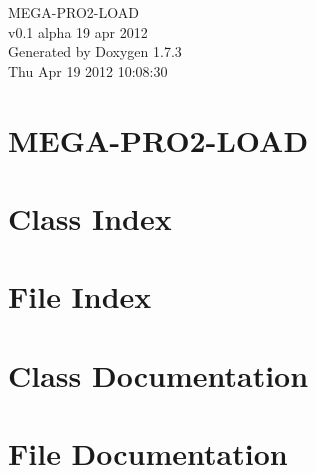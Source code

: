 \documentclass[a4paper]{book}
\begin{document}
\hypersetup{pageanchor=false}
\begin{titlepage}
\vspace*{7cm}
\begin{center}
{\Large MEGA-\/PRO2-\/LOAD \\[1ex]\large v0.1 alpha 19 apr 2012 }\\
\vspace*{1cm}
{\large Generated by Doxygen 1.7.3}\\
\vspace*{0.5cm}
{\small Thu Apr 19 2012 10:08:30}\\
\end{center}
\end{titlepage}
\clearemptydoublepage
{}
\tableofcontents
\clearemptydoublepage
{}
\hypersetup{pageanchor=true}
\chapter{MEGA-\/PRO2-\/LOAD}
\label{index}\hypertarget{index}{}
\chapter{Class Index}

\chapter{File Index}

\chapter{Class Documentation}






\chapter{File Documentation}








\printindex
\end{document}
